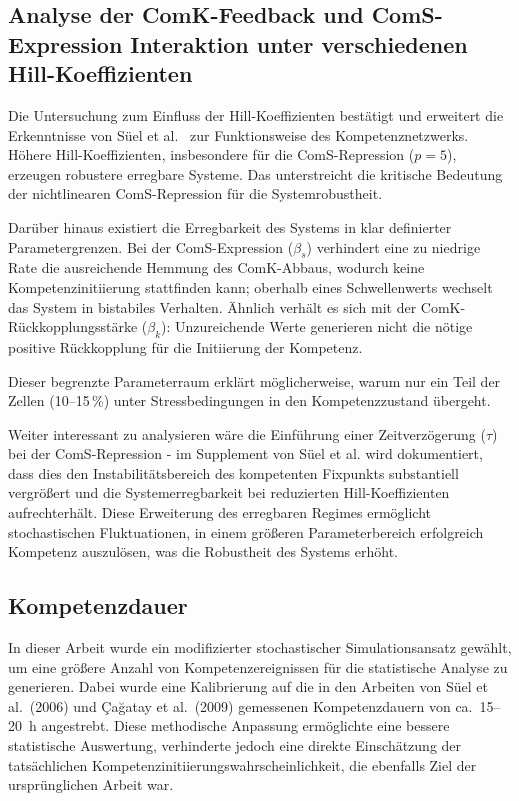 \documentclass[11pt]{article}
\begin{document}
\subsection{Analyse der ComK-Feedback und ComS-Expression Interaktion unter verschiedenen Hill-Koeffizienten}

Die Untersuchung zum Einfluss der Hill-Koeffizienten bestätigt und erweitert die Erkenntnisse von Süel et al.\ \cite{suel2006} zur Funktionsweise des Kompetenznetzwerks. Höhere Hill-Koeffizienten, insbesondere für die ComS-Repression (\( p = 5 \)), erzeugen robustere erregbare Systeme. Das unterstreicht die kritische Bedeutung der nichtlinearen ComS-Repression für die Systemrobustheit.

Darüber hinaus existiert die Erregbarkeit des Systems in  klar definierter Parametergrenzen. Bei der ComS-Expression (\( \beta_s \)) verhindert eine zu niedrige Rate die ausreichende Hemmung des ComK-Abbaus, wodurch keine Kompetenzinitiierung stattfinden kann; oberhalb eines Schwellenwerts wechselt das System in bistabiles Verhalten. Ähnlich verhält es sich mit der ComK-Rückkopplungsstärke (\( \beta_k \)): Unzureichende Werte generieren nicht die nötige positive Rückkopplung für die Initiierung der Kompetenz.

Dieser begrenzte Parameterraum erklärt möglicherweise, warum nur ein Teil der Zellen (10--15\,\%) \cite{maier2008, cagatay2009, leisner2009, maamar2007} unter Stressbedingungen in den Kompetenzzustand übergeht. 

Weiter interessant zu analysieren wäre die Einführung einer Zeitverzögerung (\( \tau \)) bei der ComS-Repression - im Supplement von Süel et al. wird dokumentiert, dass dies den Instabilitätsbereich des kompetenten Fixpunkts substantiell vergrößert und die Systemerregbarkeit bei reduzierten Hill-Koeffizienten aufrechterhält. Diese Erweiterung des erregbaren Regimes ermöglicht stochastischen Fluktuationen, in einem größeren Parameterbereich erfolgreich Kompetenz auszulösen, was die Robustheit des Systems erhöht.

\subsection{Kompetenzdauer}\label{subsection-kompetenzdauer}
In dieser Arbeit wurde ein modifizierter stochastischer Simulationsansatz gewählt, um eine größere Anzahl von Kompetenzereignissen für die statistische Analyse zu generieren. Dabei wurde eine Kalibrierung auf die in den Arbeiten von Süel et al.\ (2006) und Çağatay et al.\ (2009) gemessenen Kompetenzdauern von ca.\ 15--20~h angestrebt. Diese methodische Anpassung ermöglichte eine bessere statistische Auswertung, verhinderte jedoch eine direkte Einschätzung der tatsächlichen Kompetenzinitiierungswahrscheinlichkeit, die ebenfalls Ziel der ursprünglichen Arbeit war.
\end{document}
